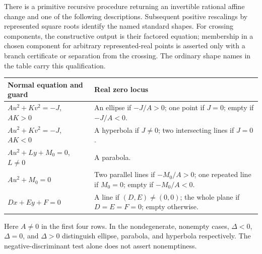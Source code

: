 \begin{theorem}
\label{con:classification}
There is a primitive recursive procedure returning an invertible rational
affine change and one of the following descriptions. Subsequent positive
rescalings by represented square roots identify the named standard shapes.
For crossing components, the constructive output is their factored
equation; membership in a chosen component for arbitrary represented-real
points is asserted only with a branch certificate or separation from the
crossing. The ordinary shape names in the table carry this qualification.
\begin{center}
\begin{tabular}{p{.27\linewidth}p{.64\linewidth}}
Normal equation and guard & Real zero locus\\\hline
$Au^2+Kv^2=-J$, $AK>0$ & An ellipse if $-J/A>0$; one point if $J=0$;
empty if $-J/A<0$.\\
$Au^2+Kv^2=-J$, $AK<0$ & A hyperbola if $J\ne0$; two intersecting lines
if $J=0$.\\
$Au^2+Ly+M_0=0$, $L\ne0$ & A parabola.\\
$Au^2+M_0=0$ & Two parallel lines if $-M_0/A>0$; one repeated line if
$M_0=0$; empty if $-M_0/A<0$.\\
$Dx+Ey+F=0$ & A line if $(D,E)\ne(0,0)$; the whole plane if $D=E=F=0$;
empty otherwise.
\end{tabular}
\end{center}
Here $A\ne0$ in the first four rows. In the nondegenerate, nonempty cases,
$\Delta<0$, $\Delta=0$, and $\Delta>0$ distinguish ellipse, parabola, and
hyperbola respectively. The negative-discriminant test alone does not
assert nonemptiness.
\end{theorem}
